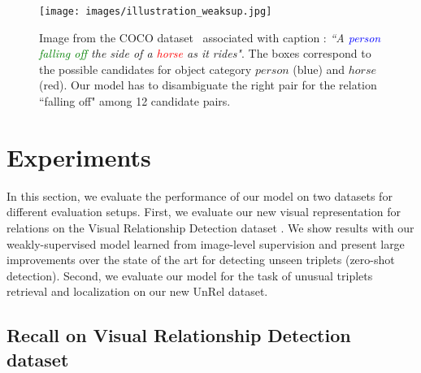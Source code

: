 \documentclass[10pt,twocolumn,letterpaper]{article}
\begin{document}
\begin{figure}[t]
	\begin{center}
   	\texttt{[image: images/illustration\_weaksup.jpg]}
	\end{center}
	\setlength\abovecaptionskip{-5pt}
   	\caption{Image from the COCO dataset~\cite{Lin2014a} associated with caption : \textit{``A \textcolor{blue}{person} \textcolor{Green}{falling off} the side of a \textcolor{red}{horse} as it rides"}. The boxes correspond to the possible candidates for object category $person$ (blue) and $horse$ (red). Our model has to disambiguate the right pair for the relation ``falling off" among 12 candidate pairs.}
   	\vspace{-.4cm}
\label{fig:coco_weak}
\end{figure}

\section{Experiments}

In this section, we evaluate the performance of our model on two
datasets for different evaluation setups. First, we evaluate our new
visual representation for relations on the Visual Relationship
Detection dataset \cite{Lu16}. We show results with our
weakly-supervised model learned from image-level supervision and
present large improvements over the state of the art for detecting
unseen triplets (zero-shot detection). Second, we evaluate our model for the task of unusual
triplets retrieval and localization on our new UnRel dataset. 


\subsection{Recall on Visual Relationship Detection dataset}
\end{document}
